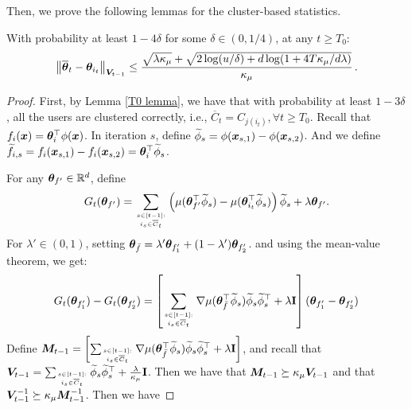 Then, we prove the following lemmas for the cluster-based statistics.
\begin{lemma}\label{lemma:concentration:theta cluster}
With probability at least $1-4\delta$ for some $\delta\in(0,1/4)$, at any $t\geq T_0$:
\begin{equation}
    \left\| \overline {\boldsymbol{\theta}}_t-\boldsymbol{\theta}_{i_t} \right\|_{\boldsymbol{V}_{t-1}}\leq\frac{\sqrt{\lambda \kappa_\mu}+\sqrt{2\log(u/\delta)+d\log(1+4T\kappa_\mu/d\lambda)}}{\kappa_\mu}\label{l2 norm difference bound for cluster}\,.
\end{equation}
\end{lemma}
\begin{proof}
First, by Lemma \ref{T0 lemma}, we have that with probability at least $1-3\delta$, all the users are clustered correctly, i.e., $\overline{C}_t=C_{j(i_t)}, \forall t\geq T_0$.  
Recall that $f_i(\boldsymbol{x})=\boldsymbol{\theta}_i^\top\phi(\boldsymbol{x})$. In iteration $s$, define $\widetilde{\phi}_s = \phi(\boldsymbol{x}_{s,1}) - \phi(\boldsymbol{x}_{s,2})$.
And we define $\widetilde{f}_{i,s} = f_i(\boldsymbol{x}_{s,1}) - f_i(\boldsymbol{x}_{s,2}) =\boldsymbol{\theta}_i^{\top} \widetilde{\phi}_s$.

For any $\boldsymbol{\theta}_{f^\prime} \in\mathbb{R}^{d}$, define 
\[
G_t(\boldsymbol{\theta}_{f^\prime}) = \sum_{s\in[t-1]:\atop i_s\in\overline{C}_t}\left(\mu(\boldsymbol{\theta}_{f^\prime}^\top\widetilde{\phi}_s ) - \mu(\boldsymbol{\theta}_{i_t}^\top\widetilde{\phi}_s) \right) \widetilde{\phi}_s  + \lambda \boldsymbol{\theta}_{f'}.
\]
For $\lambda'\in(0, 1)$, setting $\boldsymbol{\theta}_{\bar{f}} = \lambda' \boldsymbol{\theta}_{f^\prime_1} + (1 - \lambda')\boldsymbol{\theta}_{f^\prime_2}$.
and using the mean-value theorem, we get:
\begin{align}
    \label{eqn:glb}
    G_t(\boldsymbol{\theta}_{f^\prime_1}) - G_t(\boldsymbol{\theta}_{f^\prime_2}) &= \left[\sum_{s\in[t-1]:\atop i_s\in\overline{C}_t} \nabla\mu(\boldsymbol{\theta}_{\bar{f}}^\top\widetilde{\phi}_s)\widetilde{\phi}_s \widetilde{\phi}_s^\top + \lambda \mathbf{I} \right](\boldsymbol{\theta}_{f^\prime_1} - \boldsymbol{\theta}_{f^\prime_2})\nonumber \\
\end{align}
Define $\boldsymbol{M}_{t-1} = \left[\sum_{s\in[t-1]:\atop i_s\in\overline{C}_t}\nabla\mu(\boldsymbol{\theta}_{\bar{f}}^\top\widetilde{\phi}_s)\widetilde{\phi}_s \widetilde{\phi}_s^\top + \lambda \mathbf{I} \right]$, and recall that $\boldsymbol{V}_{t-1} = \sum_{s\in[t-1]:\atop i_s\in\overline{C}_t} \widetilde{\phi}_s \widetilde{\phi}_s^\top + \frac{\lambda}{\kappa_\mu} \mathbf{I}$.
Then we have that $\boldsymbol{M}_{t-1} \succeq \kappa_\mu \boldsymbol{V}_{t-1}$ and that $\boldsymbol{V}^{-1}_{t-1} \succeq \kappa_\mu \boldsymbol{M}^{-1}_{t-1}$. Then we have


\end{proof}
